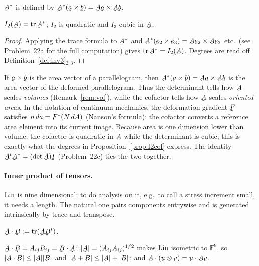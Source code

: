 \begin{definition}[Cofactor]\label{def:cof}
$\bA^{*}$ is defined by $\bA^{*}(\ba\times\bb)=\bA\ba\times\bA\bb$.
\end{definition}

\begin{proposition}\label{prop:I2cof}
$I_{2}(\bA)=\tr\bA^{*}$; $I_{2}$ is quadratic and $I_{3}$ cubic in $\bA$.
\end{proposition}

\begin{proof}
Applying the trace formula to $\bA^{*}$ and
$\bA^{*}(\be_2\times\be_3)=\bA\be_2\times\bA\be_3$ etc.\ (see Problem~22a
for the full computation) gives $\tr\bA^{*}=I_{2}(\bA)$. Degrees are read
off Definition~\ref{def:inv3}$_{2,3}$.
\end{proof}

\begin{remark}%
\label{rem:cofgeom}
If $\ba\times\bb$ is the area vector of a parallelogram, then
$\bA^{*}(\ba\times\bb)=\bA\ba\times\bA\bb$ is the area vector of the
deformed parallelogram. Thus the determinant tells how $\bA$ scales
\emph{volumes} (Remark~\ref{rem:vol}), while the cofactor tells how
$\bA$ scales \emph{oriented areas}. In the notation of continuum
mechanics, the deformation gradient $\vek{F}$ satisfies
$n\,da=\vek{F}^{*}(N\,dA)$ (Nanson's formula): the cofactor converts
a reference area element into its current image. Because area is one
dimension lower than volume, the cofactor is quadratic in $\bA$ while
the determinant is cubic; this is exactly what the degrees in
Proposition~\ref{prop:I2cof} express. The identity
$\bA^{t}\bA^{*}=(\det\bA)\I$ (Problem~22c) ties the two together.
\end{remark}

\paragraph*{Inner product of tensors.}
$\operatorname{Lin}$ is nine dimensional; to do analysis on it, e.g.\ to call a stress
increment small, it needs a length. The natural one pairs components
entrywise and is generated intrinsically by trace and transpose.

\begin{definition}\label{def:tip}
$\bA\cdot\bB:=\tr(\bA\bB^{t})$.
\end{definition}

\begin{theorem}\label{thm:tip}
$\bA\cdot\bB=A_{ij}B_{ij}=\bB\cdot\bA$; $|\bA|=(A_{ij}A_{ij})^{1/2}$ makes
$\operatorname{Lin}$ isometric to $\mathbb{E}^{9}$, so
$|\bA\cdot\bB|\le|\bA||\bB|$ and $|\bA+\bB|\le|\bA|+|\bB|$; and
$\bA\cdot(\bu\otimes\bv)=\ip\bu{\bA\bv}$.
\end{theorem}

